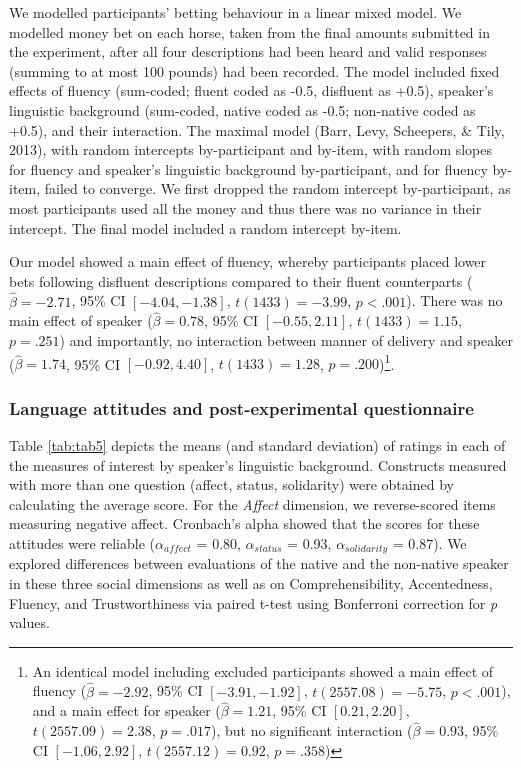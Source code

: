 \documentclass[
  man,floatsintext]{apa7}
\begin{document}
We modelled participants' betting behaviour in a linear mixed model. We modelled money bet on each horse, taken from the final amounts submitted in the experiment, after all four descriptions had been heard and valid responses (summing to at most 100 pounds) had been recorded. The model included fixed effects of fluency (sum-coded; fluent coded as -0.5, disfluent as +0.5), speaker's linguistic background (sum-coded, native coded as -0.5; non-native coded as +0.5), and their interaction. The maximal model (Barr, Levy, Scheepers, \& Tily, 2013), with random intercepts by-participant and by-item, with random slopes for fluency and speaker's linguistic background by-participant, and for fluency by-item, failed to converge. We first dropped the random intercept by-participant, as most participants used all the money and thus there was no variance in their intercept. The final model included a random intercept by-item.

Our model showed a main effect of fluency, whereby participants placed lower bets following disfluent descriptions compared to their fluent counterparts (\(\hat{\beta} = -2.71\), 95\% CI \([-4.04, -1.38]\), \(t(1433) = -3.99\), \(p < .001\)). There was no main effect of speaker (\(\hat{\beta} = 0.78\), 95\% CI \([-0.55, 2.11]\), \(t(1433) = 1.15\), \(p = .251\)) and importantly, no interaction between manner of delivery and speaker (\(\hat{\beta} = 1.74\), 95\% CI \([-0.92, 4.40]\), \(t(1433) = 1.28\), \(p = .200\))\footnote{An identical model including excluded participants showed a main effect of fluency (\(\hat{\beta} = -2.92\), 95\% CI \([-3.91, -1.92]\), \(t(2557.08) = -5.75\), \(p < .001\)), and a main effect for speaker (\(\hat{\beta} = 1.21\), 95\% CI \([0.21, 2.20]\), \(t(2557.09) = 2.38\), \(p = .017\)), but no significant interaction (\(\hat{\beta} = 0.93\), 95\% CI \([-1.06, 2.92]\), \(t(2557.12) = 0.92\), \(p = .358\))}.

\hypertarget{language-attitudes-and-post-experimental-questionnaire}{%
\subsubsection{Language attitudes and post-experimental questionnaire}\label{language-attitudes-and-post-experimental-questionnaire}}

Table \ref{tab:tab5} depicts the means (and standard deviation) of ratings in each of the measures of interest by speaker's linguistic background. Constructs measured with more than one question (affect, status, solidarity) were obtained by calculating the average score. For the \emph{Affect} dimension, we reverse-scored items measuring negative affect. Cronbach's alpha showed that the scores for these attitudes were reliable (\(\alpha_{affect}\) = 0.80, \(\alpha_{status}\) = 0.93, \(\alpha_{solidarity}\) = 0.87). We explored differences between evaluations of the native and the non-native speaker in these three social dimensions as well as on Comprehensibility, Accentedness, Fluency, and Trustworthiness via paired t-test using Bonferroni correction for \emph{p} values.
\end{document}
